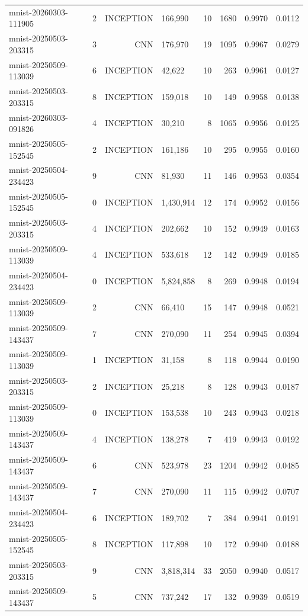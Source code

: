 \begin{tabular}{llrlrrrr}
mnist-20260303-111905 & 2 & INCEPTION & 166,990 & 10 & 1680 & 0.9970 & 0.0112 \\
mnist-20250503-203315 & 3 & CNN & 176,970 & 19 & 1095 & 0.9967 & 0.0279 \\
mnist-20250509-113039 & 6 & INCEPTION & 42,622 & 10 & 263 & 0.9961 & 0.0127 \\
mnist-20250503-203315 & 8 & INCEPTION & 159,018 & 10 & 149 & 0.9958 & 0.0138 \\
mnist-20260303-091826 & 4 & INCEPTION & 30,210 & 8 & 1065 & 0.9956 & 0.0125 \\
mnist-20250505-152545 & 2 & INCEPTION & 161,186 & 10 & 295 & 0.9955 & 0.0160 \\
mnist-20250504-234423 & 9 & CNN & 81,930 & 11 & 146 & 0.9953 & 0.0354 \\
mnist-20250505-152545 & 0 & INCEPTION & 1,430,914 & 12 & 174 & 0.9952 & 0.0156 \\
mnist-20250503-203315 & 4 & INCEPTION & 202,662 & 10 & 152 & 0.9949 & 0.0163 \\
mnist-20250509-113039 & 4 & INCEPTION & 533,618 & 12 & 142 & 0.9949 & 0.0185 \\
mnist-20250504-234423 & 0 & INCEPTION & 5,824,858 & 8 & 269 & 0.9948 & 0.0194 \\
mnist-20250509-113039 & 2 & CNN & 66,410 & 15 & 147 & 0.9948 & 0.0521 \\
mnist-20250509-143437 & 7 & CNN & 270,090 & 11 & 254 & 0.9945 & 0.0394 \\
mnist-20250509-113039 & 1 & INCEPTION & 31,158 & 8 & 118 & 0.9944 & 0.0190 \\
mnist-20250503-203315 & 2 & INCEPTION & 25,218 & 8 & 128 & 0.9943 & 0.0187 \\
mnist-20250509-113039 & 0 & INCEPTION & 153,538 & 10 & 243 & 0.9943 & 0.0218 \\
mnist-20250509-143437 & 4 & INCEPTION & 138,278 & 7 & 419 & 0.9943 & 0.0192 \\
mnist-20250509-143437 & 6 & CNN & 523,978 & 23 & 1204 & 0.9942 & 0.0485 \\
mnist-20250509-143437 & 7 & CNN & 270,090 & 11 & 115 & 0.9942 & 0.0707 \\
mnist-20250504-234423 & 6 & INCEPTION & 189,702 & 7 & 384 & 0.9941 & 0.0191 \\
mnist-20250505-152545 & 8 & INCEPTION & 117,898 & 10 & 172 & 0.9940 & 0.0188 \\
mnist-20250503-203315 & 9 & CNN & 3,818,314 & 33 & 2050 & 0.9940 & 0.0517 \\
mnist-20250509-143437 & 5 & CNN & 737,242 & 17 & 132 & 0.9939 & 0.0519 \\

\end{tabular}
